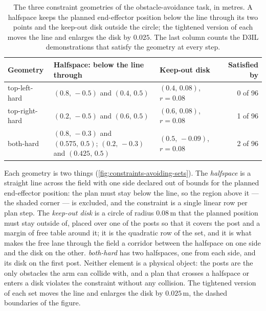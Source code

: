 \begin{table}[htpb]
  \caption[Constraint geometries of obstacle avoidance]{The three constraint geometries of the
  obstacle-avoidance task, in metres. A halfspace keeps the planned end-effector position below the line
  through its two points and the keep-out disk outside the circle; the tightened version of each moves
  the line and enlarges the disk by $0.025$. The last column counts the D3IL demonstrations that satisfy
  the geometry at every step.}
  \label{tab:avoiding-geometries}
  \centering
  \begin{tabularx}{\linewidth}{@{}l L l r@{}}
    \toprule
    Geometry & Halfspace: below the line through & Keep-out disk & Satisfied by \\
    \midrule
    top-left-hard  & $(0.8,\,-0.5)$ and $(0.4,\,0.5)$ & $(0.4,\,0.08)$, $r=0.08$ & 0 of 96 \\
    top-right-hard & $(0.2,\,-0.5)$ and $(0.6,\,0.5)$ & $(0.6,\,0.08)$, $r=0.08$ & 1 of 96 \\
    both-hard      & $(0.8,\,-0.3)$ and $(0.575,\,0.5)$; $(0.2,\,-0.3)$ and $(0.425,\,0.5)$ & $(0.5,\,-0.09)$, $r=0.08$ & 2 of 96 \\
    \bottomrule
  \end{tabularx}
\end{table}

Each geometry is two things (\autoref{fig:constraints-avoiding-sets}). The \emph{halfspace} is a straight
line across the field with one side declared out of bounds for the planned end-effector position: the plan
must stay below the line, so the region above it --- the shaded corner --- is excluded, and the constraint
is a single linear row per plan step. The \emph{keep-out disk} is a circle of radius $0.08$\,m that the
planned position must stay outside of, placed over one of the posts so that it covers the post and a margin
of free table around it; it is the quadratic row of the set, and it is what makes the free lane through the
field a corridor between the halfspace on one side and the disk on the other. \emph{both-hard} has two
halfspaces, one from each side, and its disk on the first post. Neither element is a physical object: the
posts are the only obstacles the arm can collide with, and a plan that crosses a halfspace or enters a disk
violates the constraint without any collision. The tightened version of each set moves the line and enlarges the disk by
$0.025$\,m, the dashed boundaries of the figure.

